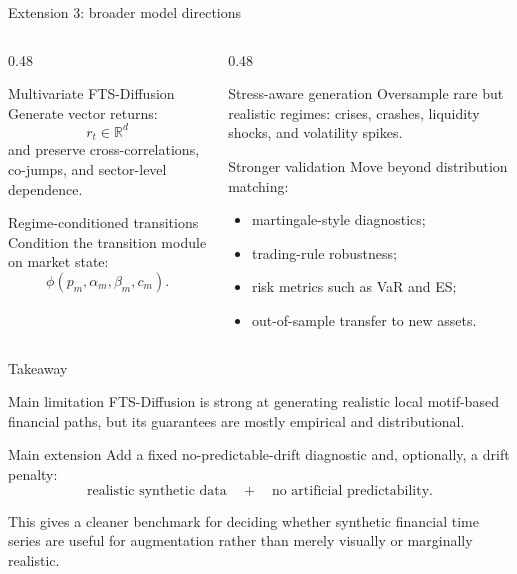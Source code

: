 \begin{frame}{Extension 3: broader model directions}

\begin{columns}[onlytextwidth]
\begin{column}{0.48\textwidth}
\begin{block}{Multivariate FTS-Diffusion}
Generate vector returns:
\[
r_t \in \mathbb{R}^d
\]
and preserve cross-correlations, co-jumps, and sector-level dependence.
\end{block}

\begin{block}{Regime-conditioned transitions}
Condition the transition module on market state:
\[
\phi(p_m,\alpha_m,\beta_m,c_m).
\]
\end{block}
\end{column}

\begin{column}{0.48\textwidth}
\begin{block}{Stress-aware generation}
Oversample rare but realistic regimes: crises, crashes, liquidity shocks, and volatility spikes.
\end{block}

\begin{block}{Stronger validation}
Move beyond distribution matching:
\begin{itemize}
\item martingale-style diagnostics;
\item trading-rule robustness;
\item risk metrics such as VaR and ES;
\item out-of-sample transfer to new assets.
\end{itemize}
\end{block}
\end{column}
\end{columns}

\end{frame}


\begin{frame}{Takeaway}

\begin{block}{Main limitation}
FTS-Diffusion is strong at generating realistic local motif-based financial paths, but its guarantees are mostly empirical and distributional.
\end{block}

\begin{block}{Main extension}
Add a fixed no-predictable-drift diagnostic and, optionally, a drift penalty:
\[
\text{realistic synthetic data}
\quad + \quad
\text{no artificial predictability}.
\]
\end{block}

\medskip

This gives a cleaner benchmark for deciding whether synthetic financial time series are useful for augmentation rather than merely visually or marginally realistic.

\end{frame}



